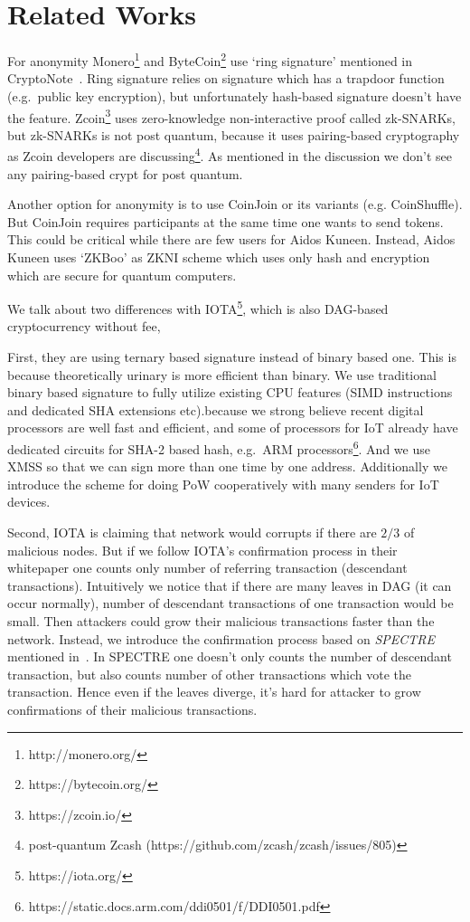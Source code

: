 \documentclass[a4paper,10pt,twocolumn]{article}
\begin{document}
\section{Related Works}

For anonymity Monero\footnote{http://monero.org/} and ByteCoin\footnote{https://bytecoin.org/} use `ring signature'
mentioned in CryptoNote~\cite{ringsig}.
Ring signature relies on signature which has a trapdoor function (e.g.\ public key encryption), but unfortunately hash-based signature
doesn't have the feature.  Zcoin\footnote{https://zcoin.io/} uses zero-knowledge non-interactive proof called zk-SNARKs, but zk-SNARKs is  not
post quantum, because it uses pairing-based cryptography as Zcoin developers are discussing\footnote{post-quantum Zcash (https://github.com/zcash/zcash/issues/805)}.
As mentioned in the discussion we don't see any pairing-based crypt for post quantum.

Another option for anonymity is to use CoinJoin or its variants (e.g. CoinShuffle). But CoinJoin
requires participants at the same time one wants to send tokens. This could be critical while there
are few users for Aidos Kuneen.
Instead,  Aidos Kuneen uses `ZKBoo' as ZKNI  scheme which uses only hash and encryption which are secure for quantum computers.

We talk about two differences with IOTA\footnote{https://iota.org/}, which is also DAG-based cryptocurrency without fee,  

First, they are using ternary based signature instead of binary based one. This is  because theoretically urinary is more efficient than binary.
We use traditional binary based signature to fully utilize existing CPU features 
(SIMD instructions and dedicated SHA extensions etc).because we strong believe recent digital processors are well fast and efficient, and
some of processors for IoT already have dedicated circuits for SHA-2 based hash, e.g.~ARM processors\footnote{https://static.docs.arm.com/ddi0501/f/DDI0501.pdf}.
And we use XMSS so that we can sign more than one time by one address.
Additionally we introduce the scheme for doing PoW cooperatively with many senders for IoT devices.

Second, IOTA is claiming that network would corrupts if there are \( 2/3 \) of malicious nodes. But if we follow IOTA's
confirmation process in their whitepaper one counts only number of referring transaction (descendant transactions). Intuitively we notice that
if there are many leaves in DAG  (it can occur normally),  number of descendant transactions  of one transaction would be small.
Then attackers could  grow their malicious transactions faster than the network. 
Instead, we introduce the confirmation process based on \emph{SPECTRE} mentioned in~\cite{spectre}.
In SPECTRE  one doesn't only counts the number of  descendant transaction,
but also counts number of other transactions which vote the transaction. 
Hence even if the leaves diverge, it's hard for attacker to grow confirmations of their malicious transactions.
\end{document}
